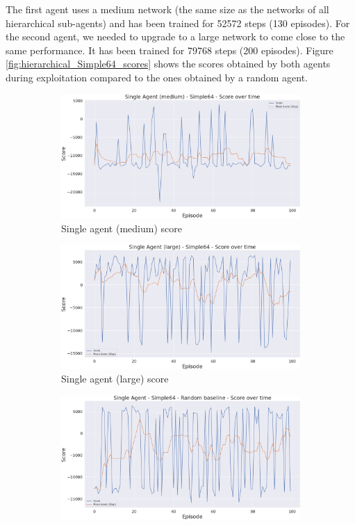 The first agent uses a medium network (the same size as the networks of all hierarchical sub-agents) and has been trained for 52572 steps (130 episodes). For the second agent, we needed to upgrade to a large network to come close to the same performance. It has been trained for 79768 steps (200 episodes). Figure \ref{fig:hierarchical_Simple64_scores} shows the scores obtained by both agents during exploitation compared to the ones obtained by a random agent.

\begin{figure}[t]
    \centering
    \begin{subfigure}[b]{0.48\textwidth}
        \includegraphics[width=1\textwidth]{figs/single_dqn_m_130/exploit/score.png}
        \caption{Single agent (medium) score}
    \end{subfigure}
    \hfill
    \begin{subfigure}[b]{0.48\textwidth}
        \includegraphics[width=1\textwidth]{figs/single_dqn_l_200/exploit/score.png}
        \caption{Single agent (large) score}
    \end{subfigure}
    \hfill
    \begin{subfigure}[b]{0.48\textwidth}
        \includegraphics[width=1\textwidth]{figs/single_random/exploit/score.png}

\end{subfigure}
\end{figure}
